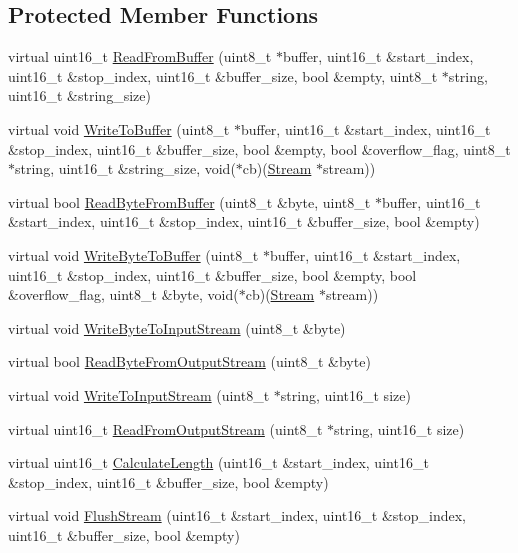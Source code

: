 \subsection*{Protected Member Functions}
\begin{DoxyCompactItemize}
\item 
virtual uint16\+\_\+t \hyperlink{class_stream_a752930f620aed4a3a80b243ce66e57ca}{Read\+From\+Buffer} (uint8\+\_\+t $\ast$buffer, uint16\+\_\+t \&start\+\_\+index, uint16\+\_\+t \&stop\+\_\+index, uint16\+\_\+t \&buffer\+\_\+size, bool \&empty, uint8\+\_\+t $\ast$string, uint16\+\_\+t \&string\+\_\+size)
\item 
virtual void \hyperlink{class_stream_a5ba59861c0ab5977d7c92d6dcd72807c}{Write\+To\+Buffer} (uint8\+\_\+t $\ast$buffer, uint16\+\_\+t \&start\+\_\+index, uint16\+\_\+t \&stop\+\_\+index, uint16\+\_\+t \&buffer\+\_\+size, bool \&empty, bool \&overflow\+\_\+flag, uint8\+\_\+t $\ast$string, uint16\+\_\+t \&string\+\_\+size, void($\ast$cb)(\hyperlink{class_stream}{Stream} $\ast$stream))
\item 
virtual bool \hyperlink{class_stream_a32e449304f65b5571fe848a503fc9d68}{Read\+Byte\+From\+Buffer} (uint8\+\_\+t \&byte, uint8\+\_\+t $\ast$buffer, uint16\+\_\+t \&start\+\_\+index, uint16\+\_\+t \&stop\+\_\+index, uint16\+\_\+t \&buffer\+\_\+size, bool \&empty)
\item 
virtual void \hyperlink{class_stream_a7b6a9a1f96e0f524e950863215128911}{Write\+Byte\+To\+Buffer} (uint8\+\_\+t $\ast$buffer, uint16\+\_\+t \&start\+\_\+index, uint16\+\_\+t \&stop\+\_\+index, uint16\+\_\+t \&buffer\+\_\+size, bool \&empty, bool \&overflow\+\_\+flag, uint8\+\_\+t \&byte, void($\ast$cb)(\hyperlink{class_stream}{Stream} $\ast$stream))
\item 
virtual void \hyperlink{class_stream_a0784d377cc92ddde7cc730be17a1a3aa}{Write\+Byte\+To\+Input\+Stream} (uint8\+\_\+t \&byte)
\item 
virtual bool \hyperlink{class_stream_a3f8e3c5513c6b8605c0fed74a3ed22bc}{Read\+Byte\+From\+Output\+Stream} (uint8\+\_\+t \&byte)
\item 
virtual void \hyperlink{class_stream_aa2f020721d273ce821ccf626e5eb773c}{Write\+To\+Input\+Stream} (uint8\+\_\+t $\ast$string, uint16\+\_\+t size)
\item 
virtual uint16\+\_\+t \hyperlink{class_stream_ab458be72cc54330f518f5ab35ab84106}{Read\+From\+Output\+Stream} (uint8\+\_\+t $\ast$string, uint16\+\_\+t size)
\item 
virtual uint16\+\_\+t \hyperlink{class_stream_a8047b62e7dcfe0e50210b3e40c7aa6eb}{Calculate\+Length} (uint16\+\_\+t \&start\+\_\+index, uint16\+\_\+t \&stop\+\_\+index, uint16\+\_\+t \&buffer\+\_\+size, bool \&empty)
\item 
virtual void \hyperlink{class_stream_a435b1b065846d3b24969cfc6dacabc6b}{Flush\+Stream} (uint16\+\_\+t \&start\+\_\+index, uint16\+\_\+t \&stop\+\_\+index, uint16\+\_\+t \&buffer\+\_\+size, bool \&empty)
\end{DoxyCompactItemize}
